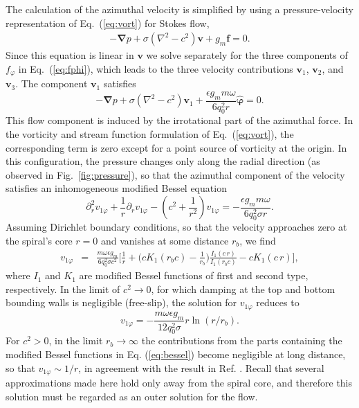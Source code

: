 \documentclass[preprint,prx,floatfix]{revtex4-1}
\begin{document}
The calculation of the azimuthal velocity is simplified by using a pressure-velocity representation of Eq.~(\ref{eq:vort}) for Stokes flow,
\begin{eqnarray}
-\bm{\nabla} p + \sigma(\nabla^2 -c^2)\mathbf{v} + g_{m} \mathbf{f} = 0. \label{eq:stokes}
\end{eqnarray}
Since this equation is linear in $\mathbf{v}$ we solve separately for the three components of $f_\varphi$ in Eq.~(\ref{eq:fphi}), which leads to the three velocity contributions $\mathbf{v}_{1}$, $\mathbf{v}_{2}$, and $\mathbf{v}_{3}$. The component $\mathbf{v}_{1}$ satisfies
\begin{equation}
-\bm{\nabla} p + \sigma(\nabla^2 -c^2)\mathbf{v}_1 + \frac{\epsilon g_m m\omega}{6 q_0^2 r} \hat{\bm{\varphi}} =0.
\label{eq:stkr1}
\end{equation}
This flow component is induced by the irrotational part of the azimuthal force. In the vorticity and stream function formulation of Eq.~(\ref{eq:vort}), the corresponding term is zero except for a point source of vorticity at the origin. In this configuration, the pressure changes only along the radial direction (as observed in Fig.~\ref{fig:pressure}), so that the azimuthal component of the velocity satisfies an inhomogeneous modified Bessel equation
\begin{equation}
\partial^2_r v_{1\varphi} + \frac{1}{r} \partial_r v_{1\varphi} - (c^2+\frac{1}{r^2})v_{1\varphi} = -\frac{\epsilon g_m m\omega}{6 q_0^2\sigma r}.
\end{equation}
Assuming Dirichlet boundary conditions, so that the velocity approaches zero at the spiral's core $r = 0$ and vanishes at some distance $r_b$, we find
\begin{eqnarray}
    v_{1\varphi} &=& \frac{m\omega \epsilon g_m}{6 q_0^2 \sigma c^2}
    \Bigg[ \frac{1}{r}+\Bigg(c K_1(r_b c) - \frac{1}{r_b}\Bigg)\frac{I_1(c\,r)}{I_1(r_b c)} - c K_1(c\,r) \Bigg],
\label{eq:bessel}
\end{eqnarray}
where $I_1$ and $K_1$ are modified Bessel functions of first and second type, respectively. In the limit of $c^2 \rightarrow 0$, for which damping at the top and bottom bounding walls is negligible (free-slip), the solution for $v_{1\varphi}$ reduces to \cite{re:misc1}
\begin{equation}
v_{1\varphi} = -\frac{m\omega \epsilon g_m}{12 q_0^2 \sigma} r \ln (r/r_b) .
\label{eq:rlogr}
\end{equation}
For $c^{2} > 0$, in the limit $r_{b} \rightarrow \infty$ the contributions from the parts containing the modified Bessel functions in Eq. (\ref{eq:bessel}) become negligible at long distance, so that $v_{1\varphi} \sim 1/r$, in agreement with the result in Ref.  \cite{cross1996theoretical}. Recall that several approximations made here hold only away from the spiral core, and therefore this solution must be regarded as an outer solution for the flow.
\end{document}
